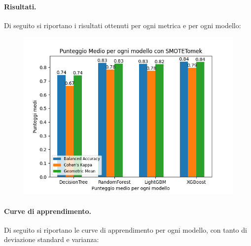 \paragraph{Risultati.} Di seguito si riportano i risultati ottenuti per ogni metrica e per ogni modello:
\begin{figure}[H]
    \centering
    \includegraphics[scale=0.5]{img/tomek_metrics.png}
\end{figure}


\paragraph{Curve di apprendimento.} Di seguito si riportano le curve di apprendimento per ogni modello, con tanto di deviazione standard e varianza:

